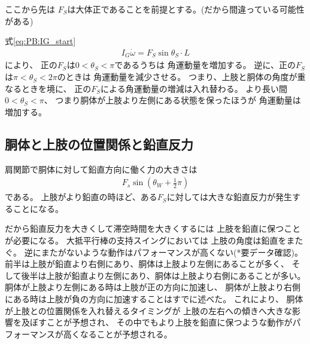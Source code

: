 \documentclass[a4paper,11pt]{jsarticle}
\begin{document}
ここから先は
$F_S$は大体正であることを前提とする。(だから間違っている可能性がある)

式\ref{eq:PB:IG_start}
\begin{align*}
  I_G\dot\omega = F_S \sin\theta_S \cdot L
\end{align*}
により、
正の$F_S$は$0 < \theta_S < \pi$であるうちは
角運動量を増加する。
逆に、正の$F_S$は$\pi < \theta_S < 2\pi$のときは
角運動量を減少させる。
つまり、上肢と胴体の角度が重なるときを境に、
正の$F_S$による角運動量の増減は入れ替わる。
より長い間$0 < \theta_S < \pi$、
つまり胴体が上肢より左側にある状態を保ったほうが
角運動量は増加する。

\subsection{胴体と上肢の位置関係と鉛直反力}
肩関節で胴体に対して鉛直方向に働く力の大きさは
\begin{align*}
  F_s\sin(\theta_W + \frac{1}{2}\pi)
\end{align*}
である。
上肢がより鉛直の時ほど、ある$F_S$に対しては大きな鉛直反力が発生することになる。

だから鉛直反力を大きくして滞空時間を大きくするには
上肢を鉛直に保つことが必要になる。
大抵平行棒の支持スイングにおいては
上肢の角度は鉛直をまたぐ。
逆にまたがないような動作はパフォーマンスが高くない(*要データ確認)。
前半は上肢が鉛直より右側にあり、胴体は上肢より左側にあることが多く、
そして後半は上肢が鉛直より左側にあり、胴体は上肢より右側にあることが多い。
胴体が上肢より左側にある時は上肢が正の方向に加速し、
胴体が上肢より右側にある時は上肢が負の方向に加速することはすでに述べた。
これにより、
胴体が上肢との位置関係を入れ替えるタイミングが
上肢の左右への傾きへ大きな影響を及ぼすことが予想され、
その中でもより上肢を鉛直に保つような動作がパフォーマンスが高くなることが予想される。
\end{document}
